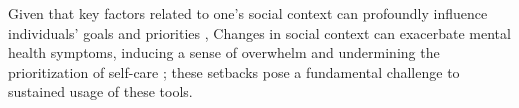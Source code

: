 Given that key factors related to one's social context can profoundly influence individuals' goals and priorities \cite{gallie2019research, allen2014social, slavich2020social, tachtler2020supporting, sabie2020memory, bhattacharjee2022kind},  Changes in social context can exacerbate mental health symptoms, inducing a sense of overwhelm and undermining the prioritization of self-care \cite{slavich2020social, mills2020prioritising}; these setbacks pose a fundamental challenge to sustained usage of these tools.
